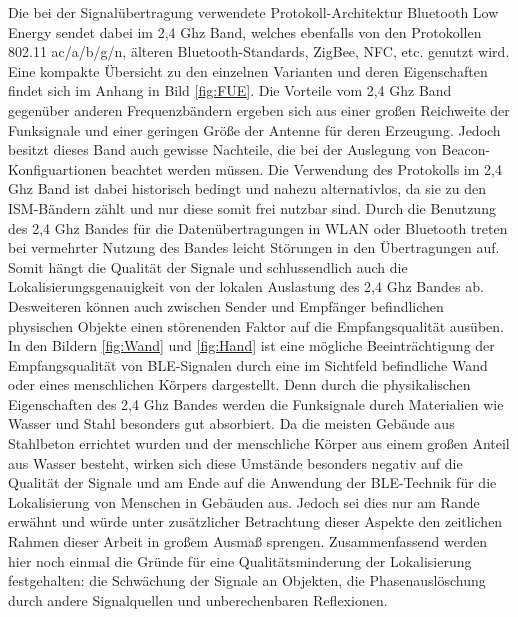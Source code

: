 Die bei der Signalübertragung verwendete Protokoll-Architektur Bluetooth Low Energy sendet dabei im 2,4 Ghz Band, welches ebenfalls von den Protokollen 802.11 ac/a/b/g/n, älteren Bluetooth-Standards, ZigBee, NFC, etc. genutzt wird. Eine kompakte Übersicht zu den einzelnen Varianten und deren Eigenschaften findet sich im Anhang in Bild \ref{fig:FUE}. Die Vorteile vom 2,4 Ghz Band gegenüber anderen Frequenzbändern ergeben sich aus einer großen Reichweite der Funksignale und einer geringen Größe der Antenne für deren Erzeugung. Jedoch besitzt dieses Band auch gewisse Nachteile, die bei der Auslegung von Beacon-Konfiguartionen beachtet werden müssen. Die Verwendung des Protokolls im 2,4 Ghz Band ist dabei historisch bedingt und nahezu alternativlos, da sie zu den ISM-Bändern \cite{BuNet} zählt und nur diese somit frei nutzbar sind. Durch die Benutzung des 2,4 Ghz Bandes für die Datenübertragungen in WLAN oder Bluetooth treten bei vermehrter Nutzung des Bandes leicht Störungen in den Übertragungen auf. Somit hängt die Qualität der Signale und schlussendlich auch die Lokalisierungsgenauigkeit von der lokalen Auslastung des 2,4 Ghz Bandes ab. Desweiteren können auch zwischen Sender und Empfänger befindlichen physischen Objekte einen störenenden Faktor auf die Empfangsqualität ausüben. In den Bildern \ref{fig:Wand} und \ref{fig:Hand} ist eine mögliche Beeinträchtigung der Empfangsqualität von BLE-Signalen durch eine im Sichtfeld befindliche Wand oder eines menschlichen Körpers dargestellt. Denn durch die physikalischen Eigenschaften des 2,4 Ghz Bandes werden die Funksignale durch Materialien wie Wasser und Stahl besonders gut absorbiert. Da die meisten Gebäude aus Stahlbeton errichtet wurden und der menschliche Körper aus einem großen Anteil aus Wasser besteht, wirken sich diese Umstände besonders negativ auf die Qualität der Signale und am Ende auf die Anwendung der BLE-Technik für die Lokalisierung von Menschen in Gebäuden aus. Jedoch sei dies nur am Rande erwähnt und würde unter zusätzlicher Betrachtung dieser Aspekte den zeitlichen Rahmen dieser Arbeit in großem Ausmaß sprengen. Zusammenfassend werden hier noch einmal die Gründe für eine Qualitätsminderung der Lokalisierung festgehalten: die Schwächung der Signale an Objekten, die Phasenauslöschung durch andere Signalquellen und unberechenbaren Reflexionen.\\ \\

